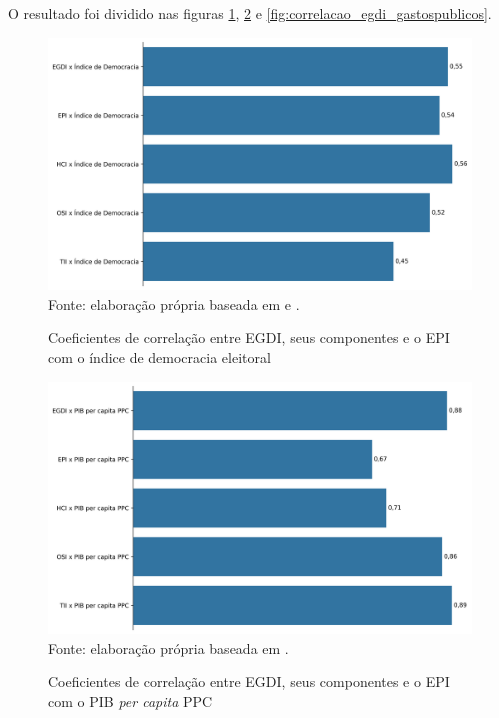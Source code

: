 O resultado foi dividido nas figuras \ref{fig:correlacao_egdi_indicedemocraciaeleitoral}, \ref{fig:correlacao_egdi_pibpercapitapcc} e \ref{fig:correlacao_egdi_gastospublicos}.

\begin{figure}[H]
	\centering
	\caption{Coeficientes de correlação entre EGDI, seus componentes e o EPI com o índice de democracia eleitoral}
	\includegraphics[width=1\linewidth]{figuras/correlacao_egdi_indicedemocraciaeleitoral.png}
	\label{fig:correlacao_egdi_indicedemocraciaeleitoral}
	\footnotesize{Fonte: elaboração própria baseada em \cite{electoral-democracy-index} e \cite{ONU_EGDI_dados}.}
\end{figure}

\begin{figure}[H]
	\centering
	\caption{Coeficientes de correlação entre EGDI, seus componentes e o EPI com o PIB \textit{per capita} PPC}
	\includegraphics[width=1\linewidth]{figuras/correlacao_egdi_pibpercapitapcc.png}
	\label{fig:correlacao_egdi_pibpercapitapcc}
	\footnotesize{Fonte: elaboração própria baseada em \cite{WB_pib_per_capita_países}.}
\end{figure}

